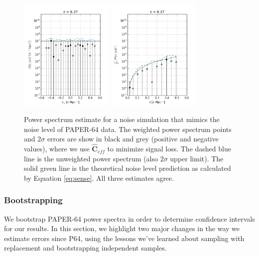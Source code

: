 \documentclass[preprint2,numberedappendix,tighten]{aastex6}  %
\begin{document}
\begin{figure}
	\centering
	\includegraphics[width=0.4\textwidth]{plots/ps1_noise_reg.png}
	\includegraphics[width=0.4\textwidth]{plots/ps2_noise_reg.png}
	\caption{Power spectrum estimate for a noise simulation that mimics the noise level of PAPER-64 data. The weighted power spectrum points and $2\sigma$ errors are show in black and grey (positive and negative values), where we use $\hat{\textbf{C}}_{eff}$ to minimize signal loss. The dashed blue line is the unweighted power spectrum (also $2\sigma$ upper limit). The solid green line is the theoretical noise level prediction as calculated by Equation \eqref{eq:sense}. All three estimates agree.}
	\label{fig:ps_noise}
\end{figure}

\subsubsection{Bootstrapping}
\label{sec:Boot}

We bootstrap PAPER-64 power spectra in order to determine confidence intervals for our results. In this section, we highlight two major changes in the way we estimate errors since P64, using the lessons we've learned about sampling with replacement and bootstrapping independent samples.
\end{document}
